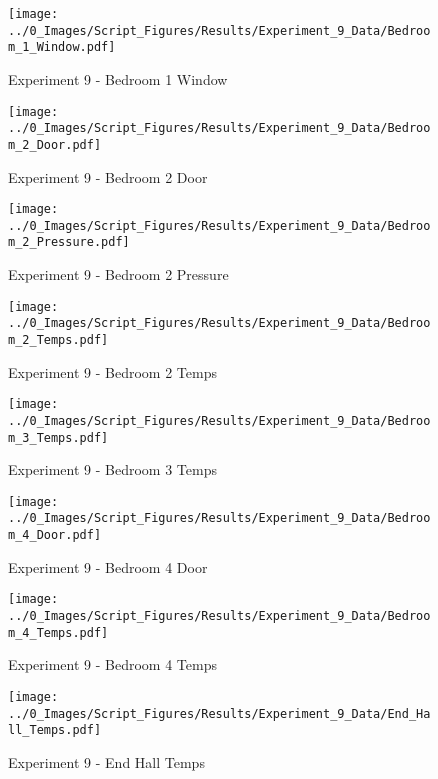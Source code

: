 	\clearpage

	\begin{figure}[H]
		\centering
		\texttt{[image: ../0\_Images/Script\_Figures/Results/Experiment\_9\_Data/Bedroom\_1\_Window.pdf]}
		\caption[]{Experiment 9 - Bedroom 1 Window}
	\end{figure}
 

	\begin{figure}[H]
		\centering
		\texttt{[image: ../0\_Images/Script\_Figures/Results/Experiment\_9\_Data/Bedroom\_2\_Door.pdf]}
		\caption[]{Experiment 9 - Bedroom 2 Door}
	\end{figure}
 
	\clearpage

	\begin{figure}[H]
		\centering
		\texttt{[image: ../0\_Images/Script\_Figures/Results/Experiment\_9\_Data/Bedroom\_2\_Pressure.pdf]}
		\caption[]{Experiment 9 - Bedroom 2 Pressure}
	\end{figure}
 

	\begin{figure}[H]
		\centering
		\texttt{[image: ../0\_Images/Script\_Figures/Results/Experiment\_9\_Data/Bedroom\_2\_Temps.pdf]}
		\caption[]{Experiment 9 - Bedroom 2 Temps}
	\end{figure}
 
	\clearpage

	\begin{figure}[H]
		\centering
		\texttt{[image: ../0\_Images/Script\_Figures/Results/Experiment\_9\_Data/Bedroom\_3\_Temps.pdf]}
		\caption[]{Experiment 9 - Bedroom 3 Temps}
	\end{figure}
 

	\begin{figure}[H]
		\centering
		\texttt{[image: ../0\_Images/Script\_Figures/Results/Experiment\_9\_Data/Bedroom\_4\_Door.pdf]}
		\caption[]{Experiment 9 - Bedroom 4 Door}
	\end{figure}
 
	\clearpage

	\begin{figure}[H]
		\centering
		\texttt{[image: ../0\_Images/Script\_Figures/Results/Experiment\_9\_Data/Bedroom\_4\_Temps.pdf]}
		\caption[]{Experiment 9 - Bedroom 4 Temps}
	\end{figure}
 

	\begin{figure}[H]
		\centering
		\texttt{[image: ../0\_Images/Script\_Figures/Results/Experiment\_9\_Data/End\_Hall\_Temps.pdf]}
		\caption[]{Experiment 9 - End Hall Temps}
	\end{figure}
 
